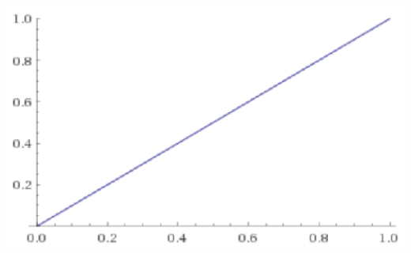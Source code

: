 \documentclass{beamer}
\begin{document}
\begin{frame}
\begin{columns}
\begin{minipage}[c][0.4\textheight][c]{\linewidth}
\end{minipage}
\begin{minipage}[c][0.4\textheight][c]{\linewidth}
  \centering
  \includegraphics[width=0.7\linewidth]{SS-19000-diag}
\end{minipage}
\end{columns}
\end{frame}
\end{document}
